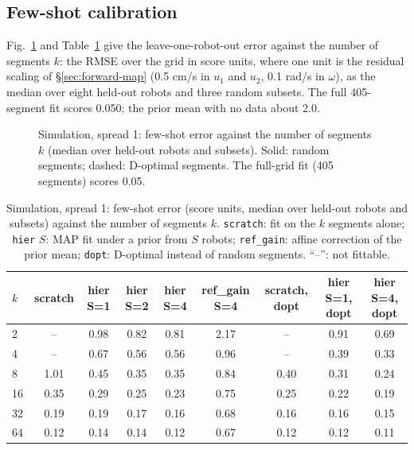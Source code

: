 \subsection{Few-shot calibration}\label{sec:sim-fewshot}

Fig.~\ref{fig:sim-fewshot} and Table~\ref{tab:2} give the
leave-one-robot-out error against the number of segments \(k\): the
RMSE over the grid in score units, where one unit is the residual
scaling of §\ref{sec:forward-map} (0.5 cm/s in \(u_1\) and \(u_2\),
0.1 rad/s in \(\omega\)), as the median over eight held-out robots and
three random subsets. The full 405-segment fit scores 0.050; the prior
mean with no data about 2.0.

\begin{figure}[t]
\centering

\caption{Simulation, spread 1: few-shot error against the number of segments \(k\) (median over held-out robots and subsets). Solid: random segments; dashed: D-optimal segments. The full-grid fit (405 segments) scores 0.05.}
\label{fig:sim-fewshot}
\end{figure}

\begin{table}[t]
\caption{Simulation, spread 1: few-shot error (score units, median over held-out robots and subsets) against the number of segments \(k\). \texttt{scratch}: fit on the \(k\) segments alone; \texttt{hier} \(S\): MAP fit under a prior from \(S\) robots; \texttt{ref\_gain}: affine correction of the prior mean; \texttt{dopt}: D-optimal instead of random segments. ``--'': not fittable.}
\label{tab:2}
\centering\footnotesize
\begin{tabular}{lcccccccc}
\toprule
\(k\) & scratch & hier S=1 & hier S=2 & hier S=4 & ref\_gain S=4 & scratch, dopt & hier S=1, dopt & hier S=4, dopt \\
\midrule
2 & -- & 0.98 & 0.82 & 0.81 & 2.17 & -- & 0.91 & 0.69 \\
4 & -- & 0.67 & 0.56 & 0.56 & 0.96 & -- & 0.39 & 0.33 \\
8 & 1.01 & 0.45 & 0.35 & 0.35 & 0.84 & 0.40 & 0.31 & 0.24 \\
16 & 0.35 & 0.29 & 0.25 & 0.23 & 0.75 & 0.25 & 0.22 & 0.19 \\
32 & 0.19 & 0.19 & 0.17 & 0.16 & 0.68 & 0.16 & 0.16 & 0.15 \\
64 & 0.12 & 0.14 & 0.14 & 0.12 & 0.67 & 0.12 & 0.12 & 0.11 \\
\bottomrule
\end{tabular}
\end{table}



